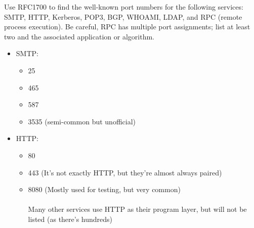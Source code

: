 \documentclass[12pt,addpoints,answers]{exam}
\begin{document}
\begin{questions}
\begin{solution}
	

\end{solution}



\question[9] Use RFC1700 to find the well-known port numbers for the following services: SMTP, HTTP, Kerberos, POP3, BGP, WHOAMI, LDAP, and RPC (remote process execution). Be careful, RPC has multiple port assignments; list at least two and the associated application or algorithm.
\begin{solution}
	\begin{itemize}
		\item SMTP:
			\begin{itemize}
				\item 25
				\item 465
				\item 587
				\item 3535 (semi-common but unofficial)
			\end{itemize}
		\item HTTP: 
			\begin{itemize}
				\item 80
				\item 443 (It's not exactly HTTP, but they're almost always paired)
				\item 8080 (Mostly used for testing, but very common)
				\\
				\\
				Many other services use HTTP as their program layer, but will not be listed (as there's hundreds)
			\end{itemize}


\end{itemize}
\end{solution}
\end{questions}
\end{document}
